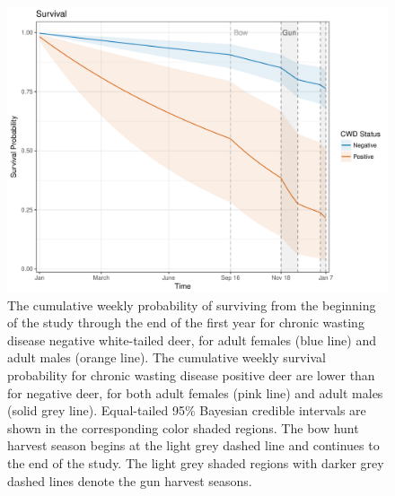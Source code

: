\documentclass[12pt]{article}\usepackage[]{graphicx}\usepackage[]{color}
\begin{document}
\begin{figure}[H]
\begin{center}
\includegraphics[width=6 in]{figures/Survival_v7}
\caption{The cumulative weekly probability of surviving from the beginning of the study through the end of the first year for chronic wasting disease negative white-tailed deer, for adult females (blue line) and adult males (orange line). The cumulative weekly survival probability for chronic wasting disease positive deer are lower than for negative deer, for both adult females (pink line) and adult males (solid grey line). Equal-tailed 95\% Bayesian credible intervals are shown in the corresponding color shaded regions. The bow hunt harvest season begins at the light grey dashed line and continues to the end of the study. The light grey shaded regions with darker grey dashed lines denote the gun harvest seasons.}\label{fig:survival_v7}
\end{center}
\end{figure}
\end{document}
